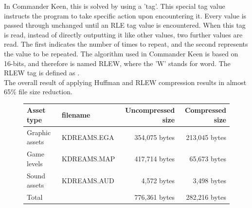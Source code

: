 \documentclass[book.tex]{subfiles}
\begin{document}
\par
In Commander Keen, this is solved by using a 'tag'. This special tag value instructs the program to take specific action upon encountering it. Every value is passed through unchanged until an RLE tag value is encountered. When this tag is read, instead of directly outputting it like other values, two further values are read. The first indicates the number of times to repeat, and the second represents the value to be repeated. The algorithm used in Commander Keen is based on 16-bits, and therefore is named RLEW, where the 'W' stands for word. The RLEW tag is defined as .\\

The overall result of applying Huffman and RLEW compression results in almost 65\% file size reduction.\\

\begin{figure}[H]
\centering
{\renewcommand{\arraystretch}{1.2} %
\begin{tabularx}{\textwidth}{X X r r }
  \hline
  \textbf{Asset type} & \textbf{filename} & \textbf{Uncompressed size\protect\footnotemark} & \textbf{Compressed size}\\ \hline
  Graphic assets & KDREAMS.EGA & 354,075 bytes & 213,045 bytes \\
  Game levels & KDREAMS.MAP & 417,714 bytes & 65,673 bytes\\ 
  Sound assets & KDREAMS.AUD & 4,572 bytes & 3,498 bytes\\ \hline
  Total &  & 776,361 bytes & 282,216 bytes\\ \hline
\end{tabularx}
}
\end{figure}

\addtocounter{footnote}{-1}


\par
\begin{minipage}{\textwidth}
 \par
 \end{minipage}\\
 
 
\end{document}

